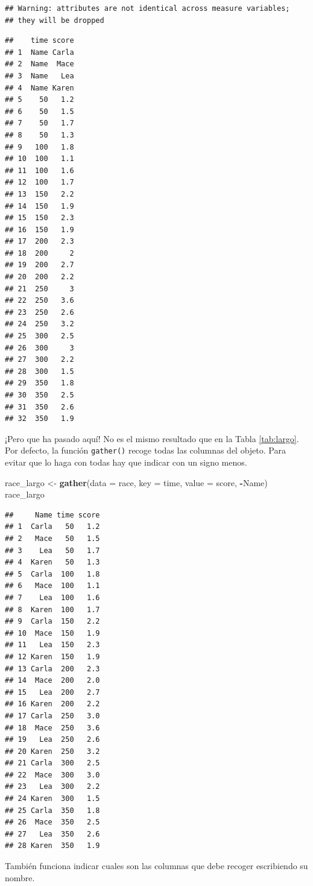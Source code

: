\documentclass[]{book}
\newenvironment{Shaded}{\begin{snugshade}}{\end{snugshade}}
\newcommand{\DataTypeTok}[1]{\textcolor[rgb]{0.13,0.29,0.53}{#1}}
\newcommand{\KeywordTok}[1]{\textcolor[rgb]{0.13,0.29,0.53}{\textbf{#1}}}
\newcommand{\NormalTok}[1]{#1}
\newcommand{\OperatorTok}[1]{\textcolor[rgb]{0.81,0.36,0.00}{\textbf{#1}}}
\newcommand{\StringTok}[1]{\textcolor[rgb]{0.31,0.60,0.02}{#1}}
\theoremstyle{definition}
\theoremstyle{definition}
\theoremstyle{definition}
\theoremstyle{remark}
\begin{document}
\begin{verbatim}
## Warning: attributes are not identical across measure variables;
## they will be dropped
\end{verbatim}

\begin{verbatim}
##    time score
## 1  Name Carla
## 2  Name  Mace
## 3  Name   Lea
## 4  Name Karen
## 5    50   1.2
## 6    50   1.5
## 7    50   1.7
## 8    50   1.3
## 9   100   1.8
## 10  100   1.1
## 11  100   1.6
## 12  100   1.7
## 13  150   2.2
## 14  150   1.9
## 15  150   2.3
## 16  150   1.9
## 17  200   2.3
## 18  200     2
## 19  200   2.7
## 20  200   2.2
## 21  250     3
## 22  250   3.6
## 23  250   2.6
## 24  250   3.2
## 25  300   2.5
## 26  300     3
## 27  300   2.2
## 28  300   1.5
## 29  350   1.8
## 30  350   2.5
## 31  350   2.6
## 32  350   1.9
\end{verbatim}

¡Pero que ha pasado aquí! No es el mismo resultado que en la Tabla
\ref{tab:largo}. Por defecto, la función \texttt{gather()} recoge todas
las columnas del objeto. Para evitar que lo haga con todas hay que
indicar con un signo menos.

\begin{Shaded}
\begin{Highlighting}[]
\NormalTok{race_largo <-}\StringTok{ }\KeywordTok{gather}\NormalTok{(}\DataTypeTok{data =}\NormalTok{ race, }\DataTypeTok{key =}\NormalTok{ time, }\DataTypeTok{value =}\NormalTok{ score, }\OperatorTok{-}\NormalTok{Name)}
\NormalTok{race_largo}
\end{Highlighting}
\end{Shaded}

\begin{verbatim}
##     Name time score
## 1  Carla   50   1.2
## 2   Mace   50   1.5
## 3    Lea   50   1.7
## 4  Karen   50   1.3
## 5  Carla  100   1.8
## 6   Mace  100   1.1
## 7    Lea  100   1.6
## 8  Karen  100   1.7
## 9  Carla  150   2.2
## 10  Mace  150   1.9
## 11   Lea  150   2.3
## 12 Karen  150   1.9
## 13 Carla  200   2.3
## 14  Mace  200   2.0
## 15   Lea  200   2.7
## 16 Karen  200   2.2
## 17 Carla  250   3.0
## 18  Mace  250   3.6
## 19   Lea  250   2.6
## 20 Karen  250   3.2
## 21 Carla  300   2.5
## 22  Mace  300   3.0
## 23   Lea  300   2.2
## 24 Karen  300   1.5
## 25 Carla  350   1.8
## 26  Mace  350   2.5
## 27   Lea  350   2.6
## 28 Karen  350   1.9
\end{verbatim}

También funciona indicar cuales son las columnas que debe recoger
escribiendo su nombre.
\end{document}
